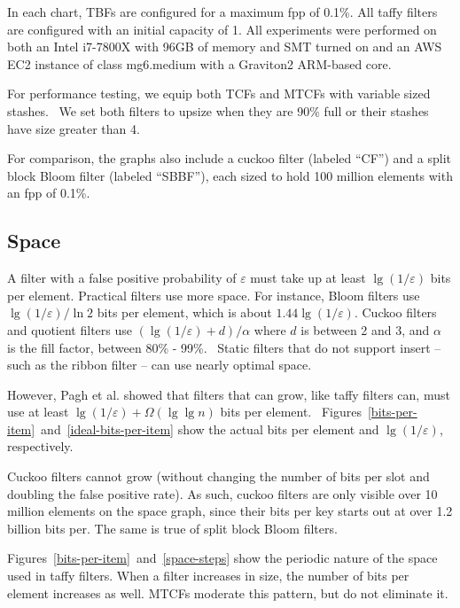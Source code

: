 \documentclass[sigconf, nonacm]{acmart}
\newcommand{\etal}{et al.}
\begin{document}
In each chart, TBFs are configured for a maximum fpp of 0.1\%.
All taffy filters are configured with an initial capacity of 1. %
All experiments were performed on both an Intel i7-7800X with 96GB of memory and SMT turned on and an AWS EC2 instance of class mg6.medium with a Graviton2 ARM-based core.

For performance testing, we equip both TCFs and MTCFs with variable sized stashes.~\cite{stash}
We set both filters to upsize when they are 90\% full or their stashes have size greater than 4.

For comparison, the graphs also include a cuckoo filter (labeled ``CF'') and a split block Bloom filter (labeled ``SBBF''), each sized to hold 100 million elements with an fpp of 0.1\%.

\subsection{Space}

A filter with a false positive probability of $\varepsilon$ must take up at least $\lg (1/\varepsilon)$ bits per element.
Practical filters use more space.
For instance, Bloom filters use $\lg (1/\varepsilon)/\ln 2$ bits per element, which is about $1.44 \lg (1/\varepsilon)$.
Cuckoo filters and quotient filters use $(\lg (1/\varepsilon) + d) / \alpha$ where $d$ is between 2 and 3, and $\alpha$ is the fill factor, between 80\% - 99\%.~\cite{cuckoo,quotient-filter,vector-quotient}
Static filters that do not support insert -- such as the ribbon filter -- can use nearly optimal space.~\cite{ribbon}

However, Pagh \etal{} showed that filters that can grow, like taffy filters can, must use at least $\lg (1/\varepsilon) + \Omega(\lg \lg n)$ bits per element.~\cite{psw}
Figures~\ref{bits-per-item}~and~\ref{ideal-bits-per-item} show the actual bits per element and $\lg (1/\varepsilon)$, respectively.

Cuckoo filters cannot grow (without changing the number of bits per slot and doubling the false positive rate).
As such, cuckoo filters are only visible over 10 million elements on the space graph, since their bits per key starts out at over 1.2 billion bits per.
The same is true of split block Bloom filters.

Figures~\ref{bits-per-item}~and~\ref{space-steps} show the periodic nature of the space used in taffy filters.
When a filter increases in size, the number of bits per element increases as well.
MTCFs moderate this pattern, but do not eliminate it.
\end{document}
